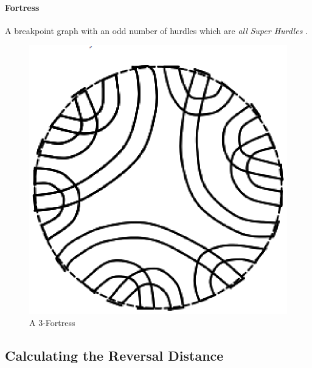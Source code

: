 \documentclass[10pt]{article}
\begin{document}
\paragraph{Fortress} A breakpoint graph with an odd number of hurdles which are
\emph{all} \emph{Super Hurdles} \cite{Hannenhalli95transformingcabbage}.

\begin{figure}[here!]
\includegraphics[scale=0.4]{resources/fortresses.eps}
\caption{A 3-Fortress \cite{Hurdles}}
\label{fig:fortresses}
\end{figure}

\subsection*{Calculating the Reversal Distance}
\end{document}
